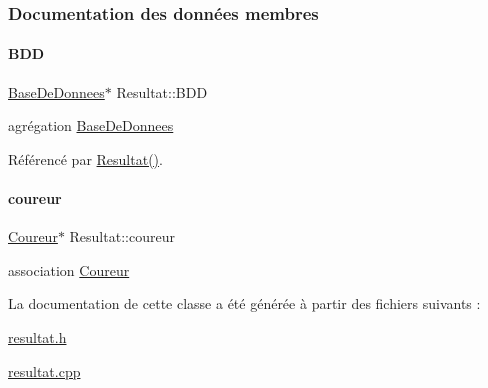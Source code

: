 \subsubsection{Documentation des données membres}
\mbox{\label{class_resultat_a25f2253e282cbedcd012c8496e219d86}} 
\paragraph{\texorpdfstring{B\+DD}{BDD}}
{\footnotesize\ttfamily \hyperlink{class_base_de_donnees}{Base\+De\+Donnees}$\ast$ Resultat\+::\+B\+DD\hspace{0.3cm}{\ttfamily [private]}}



agrégation \hyperlink{class_base_de_donnees}{Base\+De\+Donnees} 



Référencé par \hyperlink{class_resultat_a57e458f7abfc7463786ae9212bf55cd5}{Resultat()}.

\mbox{\label{class_resultat_a89183a87b7855a9b7e3b628e2f689982}} 
\paragraph{\texorpdfstring{coureur}{coureur}}
{\footnotesize\ttfamily \hyperlink{class_coureur}{Coureur}$\ast$ Resultat\+::coureur\hspace{0.3cm}{\ttfamily [private]}}



association \hyperlink{class_coureur}{Coureur} 



La documentation de cette classe a été générée à partir des fichiers suivants \+:\begin{DoxyCompactItemize}
\item 
\hyperlink{resultat_8h}{resultat.\+h}\item 
\hyperlink{resultat_8cpp}{resultat.\+cpp}\end{DoxyCompactItemize}
